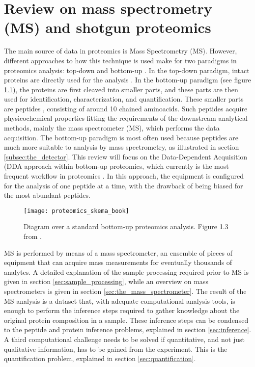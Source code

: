 \chapter{Review on mass spectrometry (\ac{MS}) and shotgun proteomics}
\label{chap:mass_spec}


The main source of data in proteomics is Mass Spectrometry (\ac{MS}). However, different approaches to how this technique is used make for two paradigms in proteomics analysis: top-down and bottom-up \cite{Joshi2016}. In the top-down paradigm, intact proteins are directly used for the analysis \cite{Sinitcyn2018}. In the bottom-up paradigm (see figure \ref{fig:proteomics_overview}), the proteins are first cleaved into smaller parts, and these parts are then used for identification, characterization, and quantification. These smaller parts are peptides \cite{Barsnes2008}, consisting of around 10 chained aminoacids. Such peptides acquire physicochemical properties fitting the requirements of the downstream analytical methods, mainly the mass spectrometer (MS), which performs the data acquisition. The bottom-up paradigm is most often used because peptides are much more suitable to analysis by mass spectrometry, as illustrated in section \ref{subsec:the_detector}. This review will focus on the Data-Dependent Acquisition (\ac{DDA} approach within bottom-up proteomics, which currently is the most frequent workflow in proteomics \cite{Sinitcyn2018}. In this approach, the equipment is configured for the analysis of one peptide at a time, with the drawback of being biased for the most abundant peptides.

\begin{figure}[!h]
\texttt{[image: proteomics\_skema\_book]}
\caption[Bottom-up proteomics analysis]{Diagram over a standard bottom-up proteomics analysis. Figure 1.3 from \cite{Barsnes2008}.}
\label{fig:proteomics_overview}
\end{figure}

\ac{MS} is performed by means of a mass spectrometer, an ensemble of pieces of equipment that can acquire mass measurements for eventually thousands of analytes. A detailed explanation of the sample processing required prior to \ac{MS} is given in section \ref{sec:sample_processing}, while an overview on mass spectrometers is given in section \ref{sec:the_mass_spectrometer}. The result of the MS analysis is a dataset that, with adequate computational analysis tools, is enough to perform the inference steps required to gather knowledge about the original protein composition in a sample. These inference steps can be condensed to the peptide and protein inference problems, explained in section \ref{sec:inference}. A third computational challenge needs to be solved if quantitative, and not just qualitative information, has to be gained from the experiment. This is the quantification problem, explained in section \ref{sec:quantification}.

